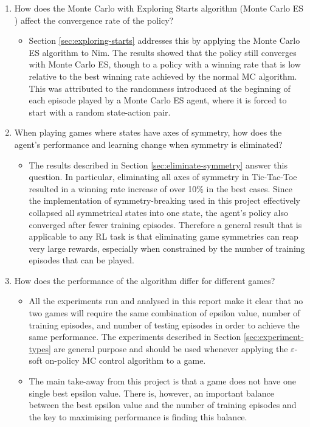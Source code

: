 \documentclass[11pt,a4paper]{report}
\begin{document}
\begin{enumerate}
    \item How does the Monte Carlo with Exploring Starts algorithm (Monte Carlo ES \cite{rl-book}) affect the convergence rate of the policy?
	\begin{itemize}
	    \item 
Section \ref{sec:exploring-starts} addresses this by applying the Monte Carlo ES algorithm to Nim. The results showed that the policy still converges with Monte Carlo ES, though to a policy with a winning rate that is low relative to the best winning rate achieved by the normal MC algorithm. This was attributed to the randomness introduced at the beginning of each episode played by a Monte Carlo ES agent, where it is forced to start with a random state-action pair.
	\end{itemize}
    
	\item When playing games where states have axes of symmetry, how does the agent's performance and learning change when symmetry is eliminated?
	\begin{itemize}
	    \item 
The results described in Section \ref{sec:eliminate-symmetry} answer this question. In particular, eliminating all axes of symmetry in Tic-Tac-Toe resulted in a winning rate increase of over 10\% in the best cases. Since the implementation of symmetry-breaking used in this project effectively collapsed all symmetrical states into one state, the agent's policy also converged after fewer training episodes. Therefore a general result that is applicable to any RL task is that eliminating game symmetries can reap very large rewards, especially when constrained by the number of training episodes that can be played.
	\end{itemize}
	
	\item How does the performance of the algorithm differ for different games?
	\begin{itemize}
	    \item 
All the experiments run and analysed in this report make it clear that no two games will require the same combination of epsilon value, number of training episodes, and number of testing episodes in order to achieve the same performance. The experiments described in Section \ref{sec:experiment-types} are general purpose and should be used whenever applying the $\varepsilon$-soft on-policy MC control algorithm to a game.
        \item 
The main take-away from this project is that a game does not have one single best epsilon value. There is, however, an important balance between the best epsilon value and the number of training episodes and the key to maximising performance is finding this balance.
	\end{itemize}
	
\end{enumerate}
\end{document}
